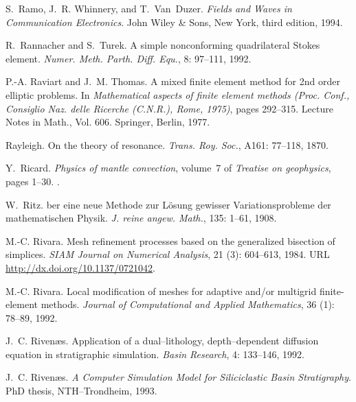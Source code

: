 \begin{thebibliography}{467}
S.~Ramo, J.~R. Whinnery, and T.~Van~Duzer.
\newblock \emph{Fields and Waves in Communication Electronics}.
\newblock John Wiley \& Sons, New York, third edition, 1994.

R.~Rannacher and S.~Turek.
\newblock A simple nonconforming quadrilateral {S}tokes element.
\newblock \emph{Numer. Meth. Parth. Diff. Equ.}, 8: 97--111, 1992.

P.-A. Raviart and J.~M. Thomas.
\newblock A mixed finite element method for 2nd order elliptic problems.
\newblock In \emph{Mathematical aspects of finite element methods ({P}roc.
  {C}onf., {C}onsiglio {N}az. delle {R}icerche ({C}.{N}.{R}.), {R}ome, 1975)},
  pages 292--315. Lecture Notes in Math., Vol. 606. Springer, Berlin, 1977.

Rayleigh.
\newblock On the theory of resonance.
\newblock \emph{Trans. Roy. Soc.}, A161: 77--118, 1870.

Y.~Ricard.
\newblock \emph{Physics of mantle convection}, volume~7 of \emph{Treatise on
  geophysics}, pages 1--30.
.

W.~Ritz.
ber eine neue {M}ethode zur {L}\"osung gewisser
  {V}ariationsprobleme der mathematischen {P}hysik.
\newblock \emph{J. reine angew. Math.}, 135: 1--61, 1908.

M.-C. Rivara.
\newblock Mesh refinement processes based on the generalized bisection of
  simplices.
\newblock \emph{SIAM Journal on Numerical Analysis}, 21 (3):
  604--613, 1984.
\newblock URL \url{http://dx.doi.org/10.1137/0721042}.

M.-C. Rivara.
\newblock Local modification of meshes for adaptive and/or multigrid
  finite-element methods.
\newblock \emph{Journal of Computational and Applied Mathematics}, 36
  (1): 78--89, 1992.

J.~C. Riven{\ae}s.
\newblock Application of a dual--lithology, depth--dependent diffusion equation
  in stratigraphic simulation.
\newblock \emph{Basin Research}, 4: 133--146, 1992.

J.~C. Riven{\ae}s.
\newblock \emph{A Computer Simulation Model for Siliciclastic Basin
  Stratigraphy}.
\newblock PhD thesis, NTH--Trondheim, 1993.


\end{thebibliography}
